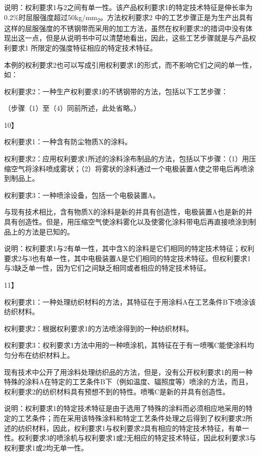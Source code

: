 说明：权利要求1与2之间有单一性。该产品权利要求1的特定技术特征是伸长率为0.2\%时屈服强度超过50kg/mm\textsubscript{2}。方法权利要求2 中的工艺步骤正是为生产出具有这样的屈服强度的不锈钢带而采用的加工方法，虽然在权利要求2的措词中没有体现出这一点，但是从说明书中可以清楚地看出，因此，这些工艺步骤就是与产品权利要求1 所限定的强度特征相应的特定技术特征。

本例的权利要求2也可以写成引用权利要求1的形式，而不影响它们之间的单一性，如：

权利要求2：一种生产权利要求1的不锈钢带的方法，包括以下工艺步骤：

{\setlength{\parindent}{17.1bp}（步骤（1）至（4）同前所述，此处省略。）\par}

{10{\kaiti 】}\par}

权利要求1：一种含有防尘物质X的涂料。

权利要求2：应用权利要求1所述的涂料涂布制品的方法，包括以下步骤：（1）用压缩空气将涂料喷成雾状；（2）将雾状的涂料通过一个电极装置A使之带电后再喷涂到制品上。

权利要求3：一种喷涂设备，包括一个电极装置A。

与现有技术相比，含有物质X的涂料是新的并具有创造性，电极装置A也是新的并具有创造性。但是，用压缩空气使涂料雾化以及使雾化涂料带电后再直接喷涂到制品上的方法是已知的。

说明：权利要求1与2有单一性，其中含X的涂料是它们相同的特定技术特征；权利要求2与3也有单一性，其中电极装置A是它们相同的特定技术特征。但权利要求1与3缺乏单一性，因为它们之间缺乏相同或者相应的特定技术特征。

{11{\kaiti 】}\par}

权利要求1：一种处理纺织材料的方法，其特征在于用涂料A在工艺条件B下喷涂该纺织材料。

权利要求2：根据权利要求1的方法喷涂得到的一种纺织材料。

权利要求3：权利要求1方法中用的一种喷涂机，其特征在于有一喷嘴C能使涂料均匀分布在纺织材料上。

现有技术中公开了用涂料处理纺织品的方法，但是，没有公开权利要求1的用一种特殊的涂料A在特定的工艺条件B下（例如温度、辐照度等）喷涂的方法，而且，权利要求2的纺织材料具有预想不到的特性。喷嘴C是新的并具有创造性。

说明：权利要求1的特定技术特征是由于选用了特殊的涂料而必须相应地采用的特定的工艺条件；而在采用该特殊涂料和特定工艺条件处理之后得到了权利要求2所述的纺织材料，因此，权利要求1与权利要求2具有相应的特定技术特征，有单一性。权利要求3的喷涂机与权利要求1或2无相应的特定技术特征，因此权利要求3与权利要求1或2均无单一性。

